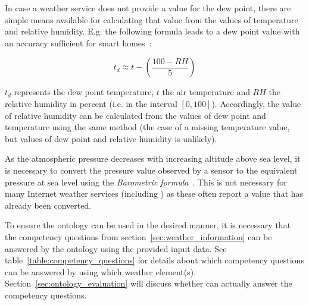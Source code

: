 In case a weather service does not provide a value for the dew point, there are simple means available for calculating that value from the values of temperature and relative humidity. E.g. the following formula leads to a dew point value with an accuracy sufficient for smart homes~\cite{dew_point_calculation}:

\[t_d \approx t-\left(\frac{100-RH}{5}\right)\]

$t_d$ represents the dew point temperature, $t$ the air temperature and $RH$ the relative humidity in percent (i.e. in the interval $[0,100]$). Accordingly, the value of relative humidity can be calculated from the values of dew point and temperature using the same method (the case of a missing temperature value, but values of dew point and relative humidity is unlikely).

As the atmospheric pressure decreases with increasing altitude above sea level, it is necessary to convert the pressure value observed by a sensor to the equivalent pressure at sea level using the \emph{Barometric formula}~\cite{us76_standard_atmosphere}.
This is not necessary for many Internet weather services (including \yrno) as these often report a value that has already been converted.

To ensure the ontology can be used in the desired manner, it is necessary that the competency questions from section~\ref{sec:weather_information} can be answered by the ontology using the provided input data. See table~\ref{table:competency_questions} %
for details about which competency questions can be answered by using which weather element(s). Section~\ref{sec:ontology_evaluation} will discuss whether \smarthomeweather can actually answer the competency questions.

